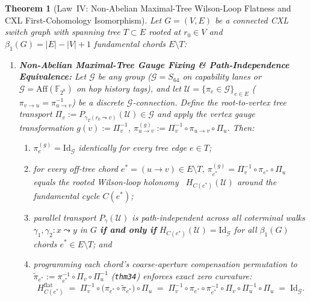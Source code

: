 \documentclass[11pt,letterpaper]{article}
\theoremstyle{spectralthm}
\newtheorem{theorem}{Theorem}[section]
\begin{document}
\begin{theorem}[Law~IV: Non-Abelian Maximal-Tree Wilson-Loop Flatness and CXL First-Cohomology Isomorphism]
\label{thm:law4_wilson_cohomology}
\label{thm:law4_gauge_cohomology}
Let $G = (V, E)$ be a connected CXL switch graph with spanning tree $T \subset E$ rooted at $r_0 \in V$ and $\beta_1(G) = |E| - |V| + 1$ fundamental chords $E \setminus T$:
\begin{enumerate}
\item \textbf{Non-Abelian Maximal-Tree Gauge Fixing \& Path-Independence Equivalence:} Let $\mathcal{G}$ be any group ($\mathcal{G} = S_{64}$ on capability lanes or $\mathcal{G} = \mathrm{Aff}(\mathbb{F}_{2^8})$ on hop history tags), and let $\mathcal{U} = \{\pi_e \in \mathcal{G}\}_{e \in E}$ ($\pi_{v\to u} = \pi_{u\to v}^{-1}$) be a discrete $\mathcal{G}$-connection. Define the root-to-vertex tree transport $\Pi_v := P_{\gamma_T(r_0 \leadsto v)}(\mathcal{U}) \in \mathcal{G}$ and apply the vertex gauge transformation $g(v) := \Pi_v^{-1}$, $\pi_{u\to v}^{(g)} := \Pi_v^{-1} \circ \pi_{u\to v} \circ \Pi_u$. Then:
\begin{enumerate}
\item $\pi_e^{(g)} = \mathrm{Id}_{\mathcal{G}}$ identically for every tree edge $e \in T$;
\item for every off-tree chord $e^* = (u \to v) \in E \setminus T$, $\pi_{e^*}^{(g)} = \Pi_v^{-1} \circ \pi_{e^*} \circ \Pi_u$ equals the rooted Wilson-loop holonomy~\cite{wilson1974confinement, kogut1975hamiltonian} $H_{C(e^*)}(\mathcal{U})$ around the fundamental cycle $C(e^*)$;
\item parallel transport $P_\gamma(\mathcal{U})$ is path-independent across all coterminal walks $\gamma_1, \gamma_2 : x \leadsto y$ in $G$ \textbf{if and only if} $H_{C(e^*)}(\mathcal{U}) = \mathrm{Id}_{\mathcal{G}}$ for all $\beta_1(G)$ chords $e^* \in E \setminus T$; and
\item programming each chord's coarse-aperture compensation permutation to $\widetilde{\pi}_{e^*} := \pi_{e^*}^{-1} \circ \Pi_v \circ \Pi_u^{-1}$ (\texttt{thm34}) enforces exact zero curvature:
\begin{equation}
\label{eq:law4_flat_holonomy}
H_{C(e^*)}^{\mathrm{flat}} \;=\; \Pi_v^{-1} \circ \bigl(\pi_{e^*} \circ \widetilde{\pi}_{e^*}\bigr) \circ \Pi_u \;=\; \Pi_v^{-1} \circ \pi_{e^*} \circ \pi_{e^*}^{-1} \circ \Pi_v \circ \Pi_u^{-1} \circ \Pi_u \;=\; \mathrm{Id}_{\mathcal{G}}.
\end{equation}
\end{enumerate}

\end{enumerate}
\end{theorem}
\end{document}
